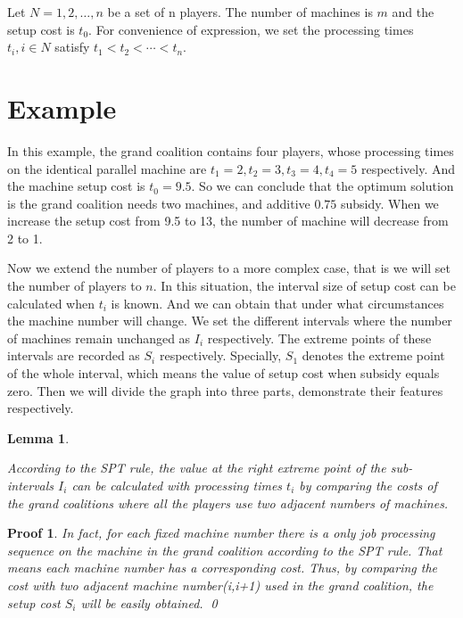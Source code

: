 \documentclass[UTF8]{article}
\newtheorem{lemma}{Lemma}
\newtheorem{pf}{Proof}
\begin{document}
Let $N={1,2,\ldots,n}$ be a set of n players. The number of machines is $m$ and the setup cost is $t_0$.
For convenience of expression, we set the processing times $t_i, i\in N$ satisfy $t_1<t_2<\cdots<t_n$.

\section{Example}
In this example, the grand coalition contains four players, whose processing times on the identical parallel machine are $t_1=2,t_2=3,t_3=4,t_4=5$ respectively. And the machine setup cost is $t_0=9.5$.
So we can conclude that the optimum solution is the grand coalition needs two machines, and additive $0.75$ subsidy. When we increase the setup cost from 9.5 to 13, the number of machine will decrease from 2 to 1.


Now we extend the number of players to a more complex case, that is we will set the number of players to $n$.
In this situation, the interval size of setup cost can be calculated when $t_i$ is known. And we can obtain that under what circumstances the machine number will change. We set the different intervals where the number of machines remain unchanged as $I_i$ respectively. The extreme points of these intervals are recorded as $S_i$ respectively. Specially, $S_1$ denotes the extreme point of the whole interval, which means the value of setup cost when subsidy equals zero. Then we will divide the graph into three parts, demonstrate their features respectively.

\begin{lemma}\label{lem1}


According to the SPT rule, the value at the right extreme point of the sub-intervals $I_i$ can be calculated with processing times $t_i$ by comparing the costs of the grand coalitions where all the players use two adjacent numbers of machines.

\end{lemma}

\begin{pf}
In fact, for each fixed machine number there is a only job processing sequence on the machine in the grand coalition according to the SPT rule. That means each machine number has a corresponding cost.
Thus, by comparing the cost with two adjacent machine number(i,i+1) used in the grand coalition, the setup cost $S_i$ will be easily obtained.
\qed
\end{pf}
\end{document}
